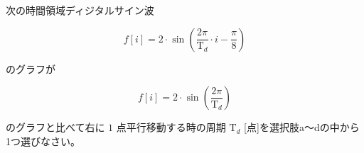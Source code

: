 次の時間領域ディジタルサイン波 

\[
f[i] = 2 \cdot \sin \left ( \frac{2 \pi}{\textrm{T}_d}  \cdot i - \frac{\pi}{8} \right )
\]

\noindent のグラフが

\[
f[i] = 2 \cdot \sin \left ( \frac{2 \pi}{\textrm{T}_d} \right )
\]

\noindent のグラフと比べて右に $1$ 点平行移動する時の周期 $\textrm{T}_d$ [点]を選択肢a〜dの中から1つ選びなさい。
